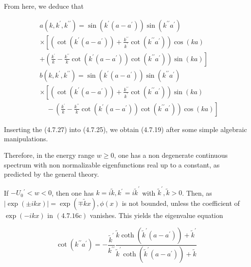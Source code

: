 \documentclass{article}
\begin{document}
From here, we deduce that
 
\begin{align*}
& a\left(k, k^{\prime}, k^{\prime \prime}\right)= \sin \left(k^{\prime}\left(a-a^{\prime}\right)\right) \sin \left(k^{\prime \prime} a^{\prime}\right)  \tag{4.7.27a}\\
& \times {\left[\left(\cot \left(k^{\prime}\left(a-a^{\prime}\right)\right)+\frac{k^{\prime \prime}}{k^{\prime}} \cot \left(k^{\prime \prime} a^{\prime}\right)\right) \cos (k a)\right.} \\
&\left.+\left(\frac{k^{\prime}}{k}-\frac{k^{\prime \prime}}{k} \cot \left(k^{\prime}\left(a-a^{\prime}\right)\right) \cot \left(k^{\prime \prime} a^{\prime}\right)\right) \sin (k a)\right] \\
& b\left(k, k^{\prime}, k^{\prime \prime}\right)=\sin \left(k^{\prime}\left(a-a^{\prime}\right)\right) \sin \left(k^{\prime \prime} a^{\prime}\right)  \tag{4.7.27b}\\
& \times {\left[\left(\cot \left(k^{\prime}\left(a-a^{\prime}\right)\right)+\frac{k^{\prime \prime}}{k^{\prime}} \cot \left(k^{\prime \prime} a^{\prime}\right)\right) \sin (k a)\right.} \\
&\left.\quad-\left(\frac{k^{\prime}}{k}-\frac{k^{\prime \prime}}{k} \cot \left(k^{\prime}\left(a-a^{\prime}\right)\right) \cot \left(k^{\prime \prime} a^{\prime}\right)\right) \cos (k a)\right]
\end{align*}
 

Inserting the (4.7.27) into (4.7.25), we obtain (4.7.19) after some simple algebraic manipulations.

Therefore, in the energy range $w \geq 0$, one has a non degenerate continuous spectrum with non normalizable eigenfunctions real up to a constant, as predicted by the general theory.

If $-U_{0}{ }^{\prime}<w<0$, then one has $k=i \tilde{k}, k^{\prime}=i \tilde{k}^{\prime}$ with $\tilde{k}^{\prime}, \tilde{k}>0$. Then, as $|\exp ( \pm i k x)|=\exp (\mp \tilde{k} x), \phi(x)$ is not bounded, unless the coefficient of $\exp (-i k x)$ in $(4.7 .16 \mathrm{c})$ vanishes. This yields the eigenvalue equation
 
\begin{equation*}
\cot \left(k^{\prime \prime} a^{\prime}\right)=-\frac{\tilde{k}^{\prime}}{k^{\prime \prime}} \frac{\tilde{k} \operatorname{coth}\left(\tilde{k}^{\prime}\left(a-a^{\prime}\right)\right)+\tilde{k}^{\prime}}{\tilde{k}^{\prime} \operatorname{coth}\left(\tilde{k}^{\prime}\left(a-a^{\prime}\right)\right)+\tilde{k}} \tag{4.7.28}
\end{equation*}
 
\end{document}
